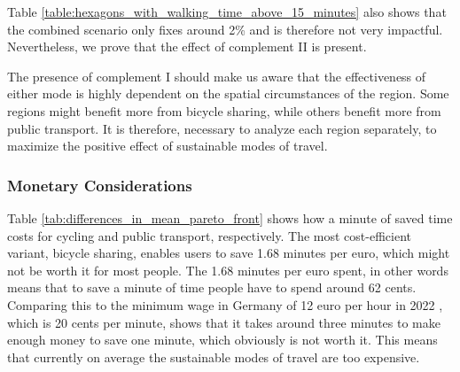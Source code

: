 Table \ref{table:hexagons_with_walking_time_above_15_minutes} also shows that the combined scenario only fixes around 2\% and is therefore not very impactful.
Nevertheless, we prove that the effect of complement II is present.

The presence of complement I should make us aware that the effectiveness of either mode is highly dependent on the spatial circumstances of the region.
Some regions might benefit more from bicycle sharing, while others benefit more from public transport.
It is therefore, necessary to analyze each region separately, to maximize the positive effect of sustainable modes of travel.





\subsubsection{Monetary Considerations}

Table \ref{tab:differences_in_mean_pareto_front} shows how a minute of saved time costs for cycling and public transport, respectively.
The most cost-efficient variant, bicycle sharing, enables users to save 1.68 minutes per euro, which might not be worth it for most people.
The 1.68 minutes per euro spent, in other words means that to save a minute of time people have to spend around 62 cents.
Comparing this to the minimum wage in Germany of 12 euro per hour in 2022 \cite{federalstatisticalofficegermanyMinimumWages}, which is 20 cents per minute, shows that it takes around three minutes to make enough money to save one minute, which obviously is not worth it.
This means that currently on average the sustainable modes of travel are too expensive.

